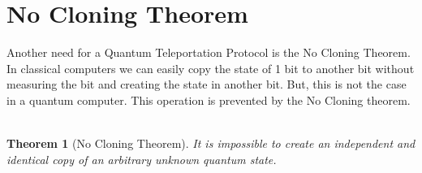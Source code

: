 \documentclass[a4paper]{article}
\newtheorem{theorem}{Theorem}
\begin{document}
\section{No Cloning Theorem}
Another need for a Quantum Teleportation Protocol is the No Cloning Theorem. \\
In classical computers we can easily copy the state of 1 bit to another bit without measuring the bit and creating the state in another bit. But, this is not the case in a quantum computer. This operation is prevented by the No Cloning theorem. \\ \\
\begin{theorem} [No Cloning Theorem]
It is impossible to create an independent and identical copy of an arbitrary unknown quantum state.
\end{theorem}
\end{document}
